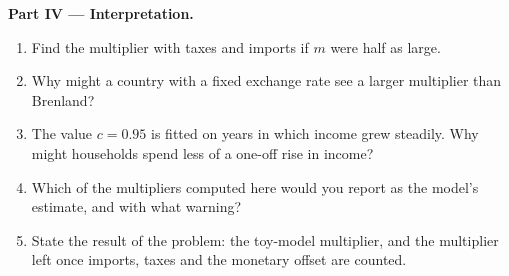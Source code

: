 \begin{problem}
\medskip
\noindent\textbf{Part IV --- Interpretation.}
\begin{enumerate}[resume]
\item Find the multiplier with taxes and imports if $m$ were half as large.
\item Why might a country with a fixed exchange rate see a larger multiplier than Brenland?
\item The value $c = 0.95$ is fitted on years in which income grew steadily. Why might households spend less of a one-off rise in income?
\item Which of the multipliers computed here would you report as the model's estimate, and with what warning?
\item State the result of the problem: the toy-model multiplier, and the multiplier left once imports, taxes and the monetary offset are counted.
\end{enumerate}
\end{problem}
